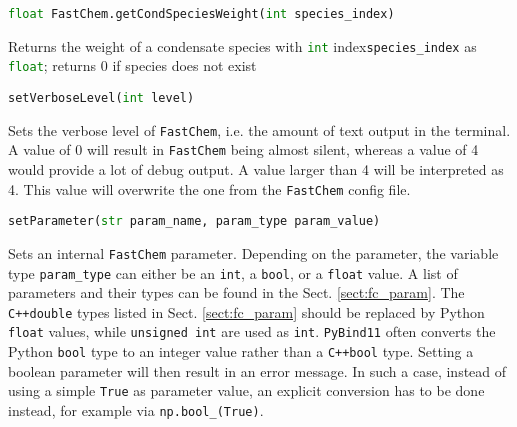 \documentclass[numbers=noenddot]{aux/fcmanual}
\newcommand{\fc}{\texttt{FastChem}\xspace}
\newcommand{\cpp}{\ttt{C++}\xspace}
\newcommand{\pb}{\texttt{PyBind11}\xspace}
\newcommand{\ttt}[1]{\texttt {#1}}
\begin{document}
\lstinline[language=Python]!float FastChem.getCondSpeciesWeight(int species_index)!
\begin{addmargin}[25pt]{0pt}
	Returns the weight of a condensate species with \lstinline[language=Python]!int! index\footnotemark[\value{footnote}] \lstinline!species_index! as \lstinline[language=Python]!float!; returns 0 if species does not exist
\end{addmargin}


\bigbreak

\lstinline[language=Python]!setVerboseLevel(int level)!
\begin{addmargin}[25pt]{0pt}
	Sets the verbose level of \fc, i.e. the amount of text output in the terminal. A value of 0 will result in \fc being almost silent, whereas a value of 4 would provide a lot of debug output. A value larger than 4 will be interpreted as 4. This value will overwrite the one from the \fc config file.
\end{addmargin}

\bigbreak

\lstinline[language=Python]!setParameter(str param_name, param_type param_value)!
\begin{addmargin}[25pt]{0pt}
  Sets an internal \fc parameter. Depending on the parameter, the variable type \lstinline!param_type! can either be an \lstinline!int!, a \lstinline!bool!, or a \lstinline!float! value. A list of parameters and their types can be found in the Sect. \ref{sect:fc_param}. The \cpp \lstinline!double! types listed in Sect. \ref{sect:fc_param} should be replaced by Python \lstinline!float! values, while  \lstinline!unsigned int! are used as  \lstinline!int!. \pb often converts the Python \lstinline!bool! type to an integer value rather than a \cpp  \lstinline!bool! type. Setting a boolean parameter will then result in an error message. In such a case, instead of using a simple \lstinline!True! as parameter value, an explicit conversion has to be done instead, for example via \lstinline!np.bool_(True)!.
\end{addmargin}





  
\end{document}
